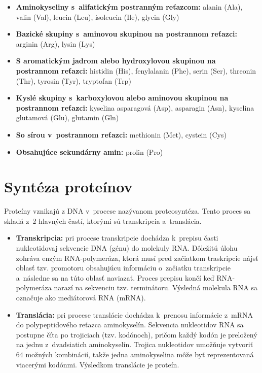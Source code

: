 \begin{itemize}
	\item \textbf{Aminokyseliny s~alifatickým postranným reťazcom:} alanin (Ala), valin (Val), leucin (Leu), isoleucin (Ile), glycin (Gly)
	\item \textbf{Bazické skupiny s~aminovou skupinou na postrannom reťazci:} arginin (Arg), lysin (Lys)
	\item \textbf{S aromatickým jadrom alebo hydroxylovou skupinou na postrannom reťazci:}
	histidin (His), fenylalanin (Phe), serin (Ser), threonin (Thr), tyrosin (Tyr), tryptofan (Trp)
	\item \textbf{Kyslé skupiny s~karboxylovou alebo aminovou skupinou na postrannom reťazci:} kyselina asparagová (Asp), asparagin (Asn), kyselina glutamová (Glu), glutamin (Gln)
	\item \textbf{So sírou v~postrannom reťazci:} methionin (Met), cystein (Cys)
	\item \textbf{Obsahujúce sekundárny amin:} prolin (Pro)
\end{itemize}

\section{Syntéza proteínov}

Proteíny vznikajú z DNA v~procese nazývanom proteosyntéza. Tento proces sa skladá z~2 hlavných častí, ktorými sú transkripcia a~translácia.

\begin{itemize}

\item \textbf{Transkripcia:} pri procese transkripcie dochádza k~prepisu časti nukleotidovaj sekvencie DNA (génu) do molekuly RNA. Dôležitú úlohu zohráva enzým RNA-polymeráza, ktorá musí pred začiatkom traskripcie nájsť oblasť tzv. promotoru obsahujúcu informáciu o~začiatku transkripcie a~následne sa na túto oblasť naviazať. Proces prepisu končí keď RNA-polymeráza narazí na sekvenciu tzv. terminátoru. Výsledná molekula RNA sa označuje ako mediátorová RNA (mRNA). 
\item \textbf{Translácia:} pri procese translácie dochádza k~prenosu informácie z~mRNA do polypeptidového reťazca aminokyselín. Sekvencia nukleotidov RNA sa postupne číta po trojiciach (tzv. kodónoch), pričom každý kodón je preložený na jednu z~dvadsiatich aminokyselín. Trojica nukleotidov umožňuje vytvoriť 64 možných kombinácií, takže jedna aminokyselina môže byť reprezentovaná viacerými kodónmi. Výsledkom translácie je proteín.

\end{itemize}
\newpage
